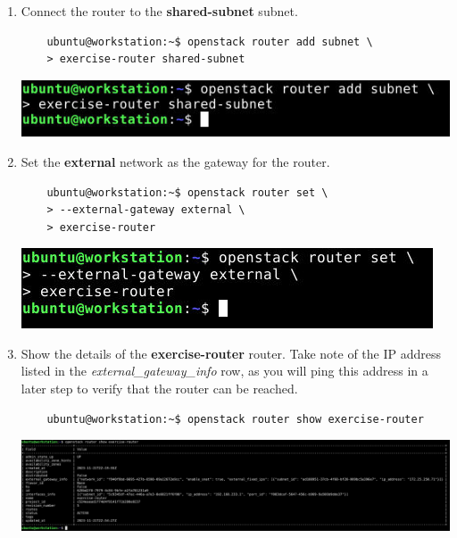 \documentclass[letterpaper, 12pt]{article}
\begin{document}
\begin{enumerate}
    \item Connect the router to the \textbf{shared-subnet} subnet.
    \begin{lstlisting}
    ubuntu@workstation:~$ openstack router add subnet \
    > exercise-router shared-subnet
    \end{lstlisting}

    \begin{center}
        \includegraphics[width=\linewidth]{images/part2/step14.png}
    \end{center}

    \item Set the \textbf{external} network as the gateway for the router.
    \begin{lstlisting}
    ubuntu@workstation:~$ openstack router set \
    > --external-gateway external \
    > exercise-router
    \end{lstlisting}

    \begin{center}
        \includegraphics[width=\linewidth]{images/part2/step15.png}
    \end{center}

    \item Show the details of the \textbf{exercise-router} router. Take note of the IP address listed in the
    \textit{external\_gateway\_info} row, as you will ping this address in a later step to verify that the router can be
    reached.
    \begin{lstlisting}
    ubuntu@workstation:~$ openstack router show exercise-router
    \end{lstlisting}

    \begin{center}
        \includegraphics[width=\linewidth]{images/part2/step16.png}
    \end{center}


\end{enumerate}
\end{document}

